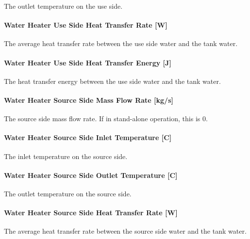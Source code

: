 The outlet temperature on the use side.

\paragraph{Water Heater Use Side Heat Transfer Rate {[}W{]}}\label{water-heater-use-side-heat-transfer-rate-w}

The average heat transfer rate between the use side water and the tank water.

\paragraph{Water Heater Use Side Heat Transfer Energy {[}J{]}}\label{water-heater-use-side-heat-transfer-energy-j}

The heat transfer energy between the use side water and the tank water.

\paragraph{Water Heater Source Side Mass Flow Rate {[}kg/s{]}}\label{water-heater-source-side-mass-flow-rate-kgs}

The source side mass flow rate. If in stand-alone operation, this is 0.

\paragraph{Water Heater Source Side Inlet Temperature {[}C{]}}\label{water-heater-source-side-inlet-temperature-c}

The inlet temperature on the source side.

\paragraph{Water Heater Source Side Outlet Temperature {[}C{]}}\label{water-heater-source-side-outlet-temperature-c}

The outlet temperature on the source side.

\paragraph{Water Heater Source Side Heat Transfer Rate {[}W{]}}\label{water-heater-source-side-heat-transfer-rate-w}

The average heat transfer rate between the source side water and the tank water.

